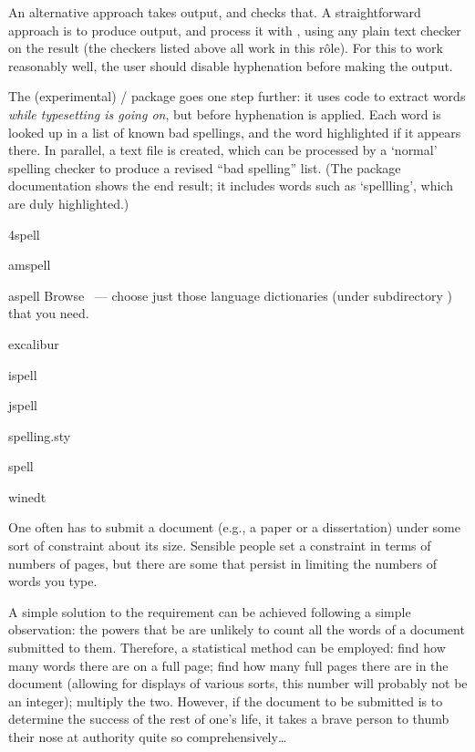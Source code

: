 An alternative approach takes \alltex{} output, and checks that.  A
straightforward approach is to produce  output, and process
it with , using any plain text checker on the
result (the checkers listed above all work in this r\^ole).  For this
to work reasonably well, the user should disable hyphenation before
making the  output.

The (experimental) \luatex{}/\latex{} package  goes
one step further: it uses  code to extract words
\emph{while typesetting is going on}, but before hyphenation is
applied.  Each word is looked up in a list of known bad spellings, and
the word highlighted if it appears there.  In parallel, a text file is
created, which can be processed by a `normal' spelling checker to
produce a revised ``bad spelling'' list.  (The package documentation
shows the end result; it includes words such as `spellling', which are
duly highlighted.)
\begin{ctanrefs}
\item[4spell]
\item[amspell]
\item[aspell]Browse ~--- choose just those language
  dictionaries (under subdirectory ) that you need.
\item[excalibur]
\item[ispell]
\item[jspell]
\item[spelling.sty]
\item[\nothtml{\bgroup\rmfamily}\acro{VMS}\nothtml{\egroup} spell]%
\item[winedt]
\end{ctanrefs}


One often has to submit a document (e.g., a paper or a dissertation)
under some sort of constraint about its size.  Sensible people set a
constraint in terms of numbers of pages, but there are some that
persist in limiting the numbers of words you type.

A simple solution to the requirement can be achieved following a
simple observation: the powers that be are unlikely to count all the
words of a document submitted to them.  Therefore, a statistical
method can be employed: find how many words there are on a full page;
find how many full pages there are in the document (allowing for
displays of various sorts, this number will probably not be an
integer); multiply the two.  However, if the document to be submitted
is to determine the success of the rest of one's life, it takes a
brave person to thumb their nose at authority quite so
comprehensively\dots{}

